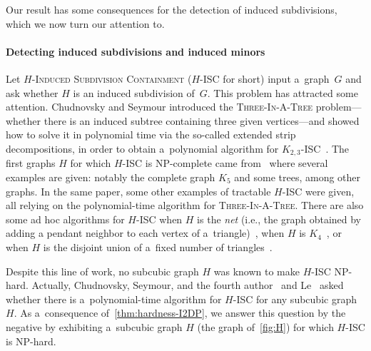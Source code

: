 \documentclass[a4paper,UKenglish,cleveref,autoref]{lipics-v2021}
\begin{document}
Our result has some consequences for the detection of induced subdivisions, which we now turn our attention to.

\paragraph*{Detecting induced subdivisions and induced minors}

Let \textsc{$H$-Induced Subdivision Containment} (\textsc{$H$-ISC} for short) input a~graph~$G$ and ask whether $H$ is an induced subdivision of~$G$.
This problem has attracted some attention.
Chudnovsky and Seymour introduced the \textsc{Three-In-A-Tree} problem---whether there is an induced subtree containing three given vertices---and showed how to solve it in polynomial time via the so-called extended strip decompositions, in order to obtain a~polynomial algorithm for \textsc{$K_{2,3}$-ISC}~\cite{DBLP:journals/combinatorica/ChudnovskyS10}.
The first graphs $H$ for which \textsc{$H$-ISC} is NP-complete came from~\cite{LevequeLMT09} where several examples are given: notably the complete graph $K_5$ and some trees, among other graphs.
In the same paper, some other examples of tractable \textsc{$H$-ISC} were given, all relying on the polynomial-time algorithm for \textsc{Three-In-A-Tree}.
There are also some ad hoc algorithms for \textsc{$H$-ISC} when $H$ is the \emph{net} (i.e., the graph obtained by adding a pendant neighbor to each vertex of a~triangle)~\cite{DBLP:journals/jct/ChudnovskyST13}, when $H$ is $K_4$~\cite{DBLP:journals/jgt/Le19}, or when $H$ is the disjoint union of a~fixed number of triangles~\cite{DBLP:journals/jctb/NguyenSS24}.

Despite this line of work, no subcubic graph $H$ was known to make \textsc{$H$-ISC} NP-hard.
Actually, Chudnovsky, Seymour, and the fourth author~\cite{DBLP:journals/jct/ChudnovskyST13} and Le~\cite{DBLP:journals/jgt/Le19} asked whether there is a~polynomial-time algorithm for \textsc{$H$-ISC} for any subcubic graph~$H$.
As a~consequence of~\cref{thm:hardness-I2DP}, we answer this question by the negative by exhibiting a~subcubic graph $H$ (the graph of~\cref{fig:H}) for which \textsc{$H$-ISC} is NP-hard.
\end{document}
